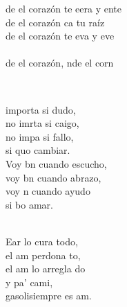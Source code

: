 \documentclass[12pt]{article}
\begin{document}
\begin{multicols*}{2}
\begin{cancion}
\begin{chorus}
	de el corazón te eera y ente  \\
	de el corazón ca tu raíz  \\
	de el corazón te eva y eve  \\
{}\vspace*{-0.4cm}\\
	de el corazón, nde el corn  \\
	\end{chorus}%
	\jump\\
\end{cancion}%

\begin{cancion}%
	 importa si dudo,  \\
	no imrta si caigo,  \\
	no impa si fallo, \\
	si quo cambiar. \\
\jump
	Voy bn cuando escucho, \\
	voy bn cuando abrazo, \\
	voy n cuando ayudo \\
	si bo amar. \\\jump\\
	\begin{chorus}%
	Ear lo cura todo, \\
	el am perdona to, \\
	el am lo arregla do \\
	y pa' cami, \\
	gasolisiempre es am.\\
	\end{chorus}%
	\jump\\
\end{cancion}%


\end{multicols*}
\end{document}
